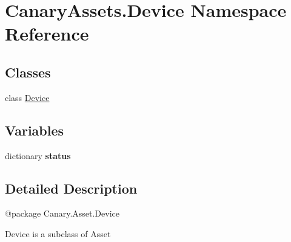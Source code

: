 \hypertarget{namespace_canary_assets_1_1_device}{\section{Canary\-Assets.\-Device Namespace Reference}
\label{namespace_canary_assets_1_1_device}
}
\subsection*{Classes}
\begin{DoxyCompactItemize}
\item 
class \hyperlink{class_canary_assets_1_1_device_1_1_device}{Device}
\end{DoxyCompactItemize}
\subsection*{Variables}
\begin{DoxyCompactItemize}
\item 
dictionary {\bfseries status}
\end{DoxyCompactItemize}


\subsection{Detailed Description}
\begin{DoxyVerb}@package Canary.Asset.Device

Device is a subclass of Asset
\end{DoxyVerb}
 

